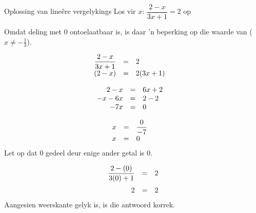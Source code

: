 \begin{wex}{Oplossing van lineêre vergelykings}
{Los vir $x$: $\dfrac{2-x}{3x+1}=2$ op} 
{
Omdat deling met $0$ ontoelaatbaar is, is daar ’n beperking op die waarde van ($x\neq -\frac{1}{3}$).

\begin{equation*}
    \begin{array}{ccll}\hfill \dfrac{2-x}{3x+1}& =& 2\hfill & \\
	\hfill (2-x)& =& 2(3x+1)\hfill & \\ 
    \end{array}
\end{equation*}

\begin{equation*}
    \begin{array}{ccll}
	\hfill 2-x& =& 6x+2\hfill & \hfill \\ 
	\hfill -x-6x& =& 2-2\hfill & \hfill \\ 
	\hfill -7x& =& 0\hfill & \hfill
    \end{array}
\end{equation*}

\begin{equation*}
    \begin{array}{ccll}

	\hfill x& =& \dfrac{0}{-7}\hfill & \\
	\hfill x& =& 0\hfill & \hfill 
    \end{array}
\end{equation*}
Let op dat $0$ gedeel deur enige ander getal is $0$.


\begin{equation*}
    \begin{array}{ccc}\hfill \dfrac{2-(0)}{3(0)+1}& =& 2\hfill \vspace{6pt}\\
	\hfill 2& =& 2\hfill 
\end{array}
\end{equation*}
Aangesien weerskante gelyk is, is die antwoord korrek.
}
\end{wex}


